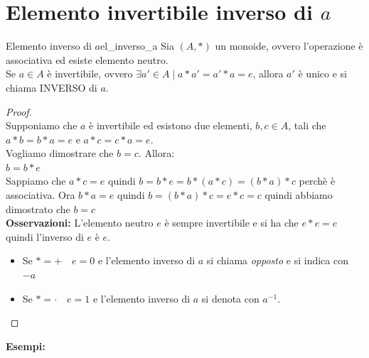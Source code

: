 \documentclass[12pt, letterpaper]{report}
\newcounter{theorem}
\newcommand{\nmu}{}
\begin{document}
		\section{Elemento invertibile inverso di $a$}
		\begin{theorem}{\nmu Elemento inverso di $a$}{el_inverso_a}
			Sia $(A, *)$ un monoide, ovvero l'operazione è associativa ed esiste elemento neutro. \\
			Se $a \in A$ è invertibile, ovvero $\exists a' \in A \mid a * a' = a'*a = e$, allora $a'$ è unico e si chiama INVERSO di $a$. \\
			\begin{proof} \quad \\
				Supponiamo che $a$ è invertibile ed esistono due elementi, $b,c \in A$, tali che $a * b = b * a = e$ e $a * c = c * a = e$. \\
				Vogliamo dimostrare che $b=c$. Allora: \\
				$b=b*e$ \\
				Sappiamo che $a*c=e$ quindi $b=b*e=b*(a*c) = (b*a)*c$ perchè è associativa. Ora $b*a=e$ quindi $b=(b*a)*c = e*c = c$ quindi abbiamo dimostrato che $b=c$ \\
				\textbf{Osservazioni:} L'elemento neutro $e$ è sempre invertibile e si ha che $e*e=e$ quindi l'inverso di $e$ è $e$.
				\begin{itemize}
					\item Se $*=+ \quad e=0$ e l'elemento inverso di $a$ si chiama \textit{opposto} e si indica con $-a$
					\item Se $*=\cdot \quad e=1$ e l'elemento inverso di $a$ si denota con $a^{-1}$.
				\end{itemize}
			\end{proof}
		\end{theorem}
		\textbf{Esempi:}
\end{document}
